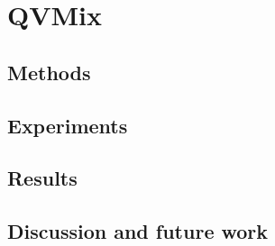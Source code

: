 \chapter{QVMix}\label{ch:qvmix}

\section{Methods}
\section{Experiments}
\section{Results}
\section{Discussion and future work}

